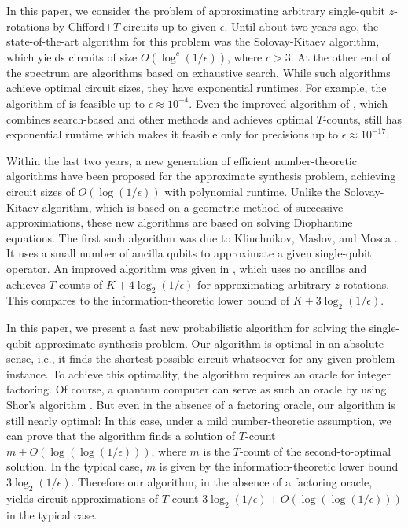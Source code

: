 \documentclass{article}
\begin{document}
In this paper, we consider the problem of approximating arbitrary
single-qubit $z$-rotations by Clifford+$T$ circuits up to given
$\epsilon$.  Until about two years ago, the state-of-the-art algorithm
for this problem was the Solovay-Kitaev algorithm, which yields
circuits of size $O(\log^c(1/\epsilon))$, where $c>3$. At the other
end of the spectrum are algorithms based on exhaustive search. While
such algorithms achieve optimal circuit sizes, they have exponential
runtimes. For example, the algorithm of {\cite{Fowler04}} is feasible
up to $\epsilon\approx 10^{-4}$. Even the improved algorithm of
{\cite{KMM-practical}}, which combines search-based and other methods
and achieves optimal $T$-counts, still has exponential runtime which
makes it feasible only for precisions up to
$\epsilon\approx 10^{-17}$.

Within the last two years, a new generation of efficient
number-theoretic algorithms have been proposed for the approximate
synthesis problem, achieving circuit sizes of $O(\log(1/\epsilon))$
with polynomial runtime. Unlike the Solovay-Kitaev algorithm, which is
based on a geometric method of successive approximations, these new
algorithms are based on solving Diophantine equations.  The first
such algorithm was due to Kliuchnikov, Maslov, and Mosca
{\cite{KMM-approx}}. It uses a small number of ancilla qubits to
approximate a given single-qubit operator. An improved algorithm was
given in {\cite{Selinger-newsynth}}, which uses no ancillas and achieves
$T$-counts of $K+4\log_2(1/\epsilon)$ for approximating arbitrary
$z$-rotations. This compares to the information-theoretic lower bound
of $K+3\log_2(1/\epsilon)$.

In this paper, we present a fast new probabilistic algorithm for
solving the single-qubit approximate synthesis problem. Our algorithm
is optimal in an absolute sense, i.e., it finds the shortest possible
circuit whatsoever for any given problem instance. To achieve this
optimality, the algorithm requires an oracle for integer factoring. Of
course, a quantum computer can serve as such an oracle by using Shor's
algorithm {\cite{Shor}}.  But even in the absence of a factoring
oracle, our algorithm is still nearly optimal: In this case, under a
mild number-theoretic assumption, we can prove that the algorithm
finds a solution of $T$-count $m + O(\log(\log(1/\epsilon)))$, where
$m$ is the $T$-count of the second-to-optimal solution. In the typical
case, $m$ is given by the information-theoretic lower bound
$3\log_2(1/\epsilon)$. Therefore our algorithm, in the absence of a
factoring oracle, yields circuit approximations of $T$-count
$3\log_2(1/\epsilon) + O(\log(\log(1/\epsilon)))$ in the typical case.
\end{document}
